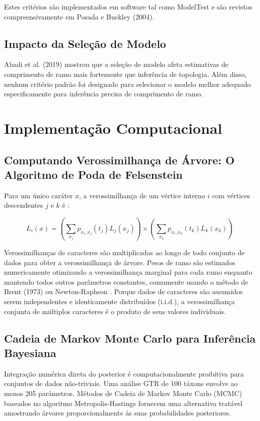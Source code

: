 Estes critérios são implementados em software tal como ModelTest e são revistos compreensivamente em Posada e Buckley (2004).

\subsection{Impacto da Seleção de Modelo}

Abadi et al. (2019) mostrou que a seleção de modelo afeta estimativas de comprimento de ramo mais fortemente que inferência de topologia. Além disso, nenhum critério padrão foi designado para selecionar o modelo melhor adequado especificamente para inferência precisa de comprimento de ramo.

\section{Implementação Computacional}

\subsection{Computando Verossimilhança de Árvore: O Algoritmo de Poda de Felsenstein}

Para um único caráter $x$, a verossimilhança de um vértice interno $i$ com vértices descendentes $j$ e $k$ é \parencite{wheeler2012}:

$$L_i(x) = \left(\sum_{x_j} p_{x_i, x_j}(t_j) L_j(x_j)\right) \times \left(\sum_{x_k} p_{x_i, x_k}(t_k) L_k(x_k)\right)$$

Verossimilhanças de caracteres são multiplicadas ao longo de todo conjunto de dados para obter a verossimilhança de árvore. Pesos de ramo são estimados numericamente otimizando a verossimilhança marginal para cada ramo enquanto mantendo todos outros parâmetros constantes, comumente usando o método de Brent (1973) ou Newton-Raphson \parencite{ypma1995}. Porque dados de caracteres são assumidos serem independentes e identicamente distribuídos (i.i.d.), a verossimilhança conjunta de múltiplos caracteres é o produto de seus valores individuais.

\subsection{Cadeia de Markov Monte Carlo para Inferência Bayesiana}

Integração numérica direta do posterior é computacionalmente proibitiva para conjuntos de dados não-triviais. Uma análise GTR de 100 táxons envolve ao menos 205 parâmetros. Métodos de Cadeia de Markov Monte Carlo (MCMC) baseados no algoritmo Metropolis-Hastings \parencite{metropolis1953,hastings1970} fornecem uma alternativa tratável amostrando árvores proporcionalmente às suas probabilidades posteriores.

